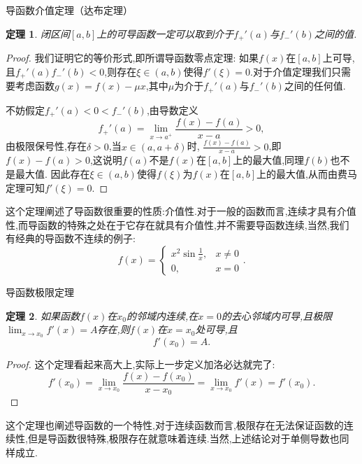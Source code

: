 \documentclass[UTF8,no-math,12pt,openany,table,dvipsnames,svgnames]{book}
\newtheorem{theorem}{定理}
\begin{document}
\pagestyle{fancy}
\fancyhf{}
\cfoot{\tikz\node[draw,cloud,cloud puffs=16,aspect=2,inner sep=0pt,fill=gray!20]{\thepage};}


\begin{MYBOX}[colbacktitle=green]{导函数介值定理（达布定理）}
\begin{theorem}
闭区间$[a,b]$上的可导函数一定可以取到介于$f_+'(a)$与$f_-'(b)$之间的值.
\end{theorem}
\tcblower
\begin{proof}
我们证明它的等价形式,即所谓导函数零点定理: 如果$f(x)$在$[a,b]$上可导,且$f_+'(a)f_-'(b)<0$,则存在$\xi\in(a,b)$使得$f'(\xi)=0$.对于介值定理我们只需要考虑函数$g(x)=f(x)-\mu x$,其中$\mu$为介于$f_+'(a)$与$f_-'(b)$之间的任何值.

\hspace{2em}不妨假定$f_+'(a)<0<f_-'(b)$,由导数定义
\[f_+'(a)=\lim_{x\to a^+}\frac{f(x)-f(a)}{x-a}>0,\]
由极限保号性,存在$\delta>0$,当$x\in(a,a+\delta)$时, $\frac{f(x)-f(a)}{x-a}>0$,即$f(x)-f(a)>0$,这说明$f(a)$不是$f(x)$在$[a,b]$上的最大值,同理$f(b)$也不是最大值. 因此存在$\xi\in(a,b)$使得$f(\xi)$为$f(x)$在$[a,b]$上的最大值,从而由费马定理可知$f'(\xi)=0$.
\end{proof}
\hspace{2em}这个定理阐述了导函数很重要的性质:介值性.对于一般的函数而言,连续才具有介值性,而导函数的特殊之处在于它存在就具有介值性,并不需要导函数连续,当然,我们有经典的导函数不连续的例子:
\[f(x)=\begin{cases}
x^2\sin\frac1x,&x\ne0\\
0,&x=0
\end{cases}.\]
\end{MYBOX}
\begin{MYBOX}[colbacktitle=blue]{导函数极限定理}
\begin{theorem}
如果函数$f(x)$在$x_0$的邻域内连续,在$x=0$的去心邻域内可导,且极限$\lim_{x\to x_0}f'(x)=A$存在,则$f(x)$在$x=x_0$处可导,且
\[f'(x_0)=A.\]
\end{theorem}
\tcblower
\begin{proof}
这个定理看起来高大上,实际上一步定义加洛必达就完了:
\[
f'\left( x_0 \right) =\lim_{x\rightarrow x_0} \frac{f\left( x \right) -f\left( x_0 \right)}{x-x_0}=\lim_{x\rightarrow x_0} f'\left( x \right) =f'\left( x_0 \right).
\]
\end{proof}
\hspace{2em}这个定理也阐述导函数的一个特性,对于连续函数而言,极限存在无法保证函数的连续性,但是导函数很特殊,极限存在就意味着连续.当然,上述结论对于单侧导数也同样成立.
\end{MYBOX}
\end{document}
